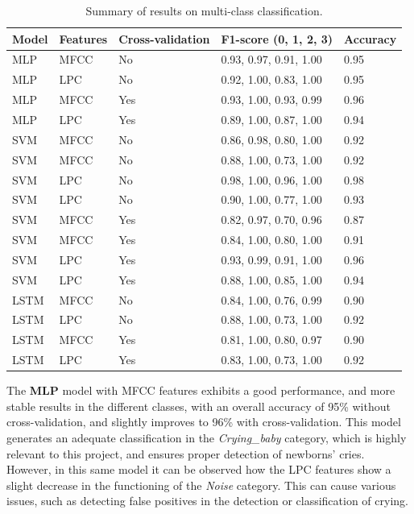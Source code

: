 \renewcommand{\arraystretch}{1.5} %
\setlength\extrarowheight{5pt} %
\begin{table}[!ht]
    \small
    \setlength\extrarowheight{2pt} %
    \begin{tabularx}{\textwidth}{m{1.5cm}m{1.5cm}m{2cm}m{4.5cm}m{2cm}}
    \toprule
        \rowcolor{orange!10}
        \textbf{Model} & \textbf{Features} & \textbf{Cross-validation} & \textbf{F1-score (0, 1, 2, 3)}  & \textbf{Accuracy} \\
    \midrule  
    MLP & MFCC & No & 0.93, 0.97, 0.91, 1.00 & 0.95 \\
    MLP & LPC & No & 0.92, 1.00, 0.83, 1.00 & 0.95 \\
    MLP & MFCC & Yes & 0.93, 1.00, 0.93, 0.99 & 0.96 \\
    MLP & LPC & Yes & 0.89, 1.00, 0.87, 1.00 & 0.94 \\
    SVM & MFCC & No & 0.86, 0.98, 0.80, 1.00 & 0.92 \\
    SVM & MFCC & No & 0.88, 1.00, 0.73, 1.00 & 0.92 \\
    SVM & LPC & No & 0.98, 1.00, 0.96, 1.00 & 0.98 \\
    SVM & LPC & No & 0.90, 1.00, 0.77, 1.00 & 0.93 \\
    SVM & MFCC & Yes & 0.82, 0.97, 0.70, 0.96 & 0.87 \\
    SVM & MFCC & Yes & 0.84, 1.00, 0.80, 1.00 & 0.91 \\
    SVM & LPC & Yes & 0.93, 0.99, 0.91, 1.00 & 0.96 \\
    SVM & LPC & Yes & 0.88, 1.00, 0.85, 1.00 & 0.94 \\
    LSTM & MFCC & No & 0.84, 1.00, 0.76, 0.99 & 0.90 \\
    LSTM & LPC & No & 0.88, 1.00, 0.73, 1.00 & 0.92 \\
    LSTM & MFCC & Yes & 0.81, 1.00, 0.80, 0.97 & 0.90 \\
    LSTM & LPC & Yes & 0.83, 1.00, 0.73, 1.00 & 0.92 \\
    \bottomrule
    \end{tabularx}
    \vspace{10pt} 
    \caption{Summary of results on multi-class classification.}
    \label{table:multiclass-results}
\end{table}

The \textbf{MLP} model with MFCC features exhibits a good performance, and more stable results in the different classes, with an overall accuracy of 95\% without cross-validation, and slightly improves to 96\% with cross-validation. This model generates an adequate classification in the \textit{Crying\_baby} category, which is highly relevant to this project, and ensures proper detection of newborns’ cries. However, in this same model it can be observed how the LPC features show a slight decrease in the functioning of the \textit{Noise} category. This can cause various issues, such as detecting false positives in the detection or classification of crying.

